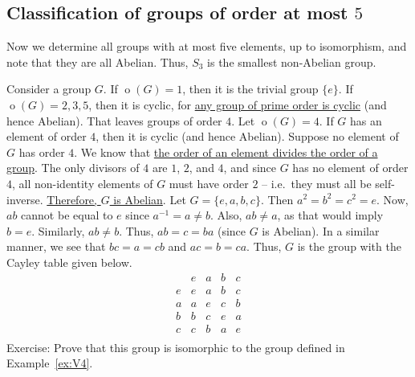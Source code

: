 \documentclass[svgnames]{article}
\theoremstyle{definition}
\theoremstyle{remark}
\DeclareMathOperator{\ord}{o}
\begin{document}
\begin{appendices}
\section{Classification of groups of order at most $5$}\label{sec:|G|<=5}
Now we determine all groups with at most five elements, up to isomorphism, and note that they are all Abelian. Thus, $S_3$ is the smallest non-Abelian group.

Consider a group $G$. If $\ord(G) = 1$, then it is the trivial group $\{e\}$. If $\ord(G) = 2, 3, 5$, then it is cyclic, for \hyperref[cor:Prime=>Cyc]{any group of prime order is cyclic} (and hence Abelian). That leaves groups of order $4$. Let $\ord(G) = 4$. If $G$ has an element of order $4$, then it is cyclic (and hence Abelian). Suppose no element of $G$ has order $4$. We know that \hyperref[cor:OrderElem]{the order of an element divides the order of a group}. The only divisors of $4$ are $1$, $2$, and $4$, and since $G$ has no element of order $4$, all non-identity elements of $G$ must have order $2$ -- i.e.\ they must all be self-inverse. \hyperref[it:Ord2=>Abelian]{Therefore, $G$ is Abelian}. Let $G = \{e, a, b, c\}$. Then $a^2 = b^2 = c^2 = e$. Now, $ab$ cannot be equal to $e$ since $a^{-1} = a \ne b$. Also, $ab \ne a$, as that would imply $b = e$. Similarly, $ab \ne b$. Thus, $ab = c = ba$ (since $G$ is Abelian). In a similar manner, we see that $bc = a = cb$ and $ac = b = ca$. Thus, $G$ is the group with the Cayley table given below.
\begin{equation*}
\begin{array}{r|cccc}
	&	e	&	a	&	b	&	c\\
\hline
e	&	e	&	a	&	b	&	c\\
a	&	a	&	e	&	c	&	b\\
b	&	b	&	c	&	e	&	a\\
c	&	c	&	b	&	a	&	e\\
\end{array}
\end{equation*}
{\small Exercise: Prove that this group is isomorphic to the group defined in Example~\ref{ex:V4}}.

\end{appendices}
\end{document}
